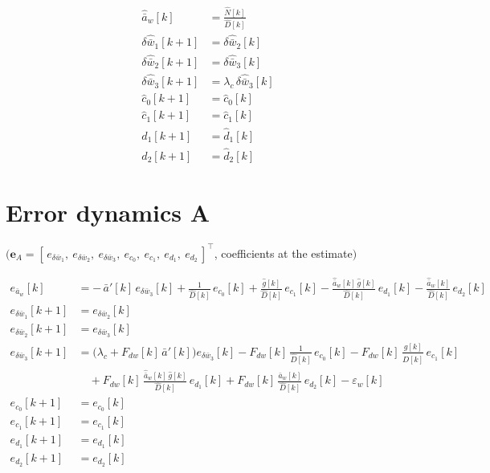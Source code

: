 \documentclass[11pt,a4paper,fontset=none]{ctexart}
\newcommand{\ba}{\bar{a}}
\newcommand{\bw}{\bar{w}}
\newcommand{\ap}{\ba'}
\newcommand{\ah}{\hat{\ba}_w}
\newcommand{\gh}{\hat g}
\newcommand{\Nh}{\hat N}
\newcommand{\Dh}{\hat D}
\begin{document}
\begin{align*}
\ah[k]                 &= \frac{\Nh[k]}{\Dh[k]} \\
\delta\hat{\bw}_1[k+1] &= \delta\hat{\bw}_2[k] \\
\delta\hat{\bw}_2[k+1] &= \delta\hat{\bw}_3[k] \\
\delta\hat{\bw}_3[k+1] &= \lambda_c\,\delta\hat{\bw}_3[k] \\
\hat c_0[k+1]          &= \hat c_0[k] \\
\hat c_1[k+1]          &= \hat c_1[k] \\
\hat d_1[k+1]          &= \hat d_1[k] \\
\hat d_2[k+1]          &= \hat d_2[k]
\end{align*}

\section{Error dynamics A}

$\bigl(\mathbf{e}_A = [\,e_{\delta\bw_1},\ e_{\delta\bw_2},\ e_{\delta\bw_3},\ e_{c_0},\ e_{c_1},\ e_{d_1},\ e_{d_2}\,]^{\top}$, coefficients at the estimate$\bigr)$

\begin{align*}
e_{\ba_w}[k]         &= -\,\ap[k]\,e_{\delta\bw_3}[k]
                        + \frac{1}{\Dh[k]}\,e_{c_0}[k]
                        + \frac{\gh[k]}{\Dh[k]}\,e_{c_1}[k]
                        - \frac{\ah[k]\,\gh[k]}{\Dh[k]}\,e_{d_1}[k]
                        - \frac{\ah[k]}{\Dh[k]}\,e_{d_2}[k] \\[6pt]
e_{\delta\bw_1}[k+1] &= e_{\delta\bw_2}[k] \\
e_{\delta\bw_2}[k+1] &= e_{\delta\bw_3}[k] \\
e_{\delta\bw_3}[k+1] &= \bigl(\lambda_c + F_{dw}[k]\,\ap[k]\bigr)e_{\delta\bw_3}[k]
                        - F_{dw}[k]\,\frac{1}{\Dh[k]}\,e_{c_0}[k]
                        - F_{dw}[k]\,\frac{\gh[k]}{\Dh[k]}\,e_{c_1}[k] \\
                     &\quad + F_{dw}[k]\,\frac{\ah[k]\,\gh[k]}{\Dh[k]}\,e_{d_1}[k]
                        + F_{dw}[k]\,\frac{\ah[k]}{\Dh[k]}\,e_{d_2}[k] - \varepsilon_w[k] \\
e_{c_0}[k+1]         &= e_{c_0}[k] \\
e_{c_1}[k+1]         &= e_{c_1}[k] \\
e_{d_1}[k+1]         &= e_{d_1}[k] \\
e_{d_2}[k+1]         &= e_{d_2}[k]
\end{align*}
\end{document}

